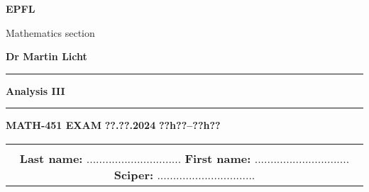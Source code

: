 \documentclass[a4paper]{article}%
\begin{document}

\pagestyle{empty}

\noindent \textbf{EPFL} 

\noindent Mathematics section

\noindent \textbf{Dr Martin Licht} 

\vspace{0.2cm}

\hrule 

\vspace{0.3cm}

\begin{center}
{\LARGE\bf Analysis III}
\end{center}

\vspace{0.3cm}

\hrule

\vspace{0.3cm}

\noindent
\textbf{MATH-451 EXAM}
\hfill
\textbf{??.??.2024}
\hfill 
\textbf{??h??--??h??}


\vspace{1cm} 
\noindent
\begin{tabular}{|c|}
\hline
\\
\textbf{Last name: } ..............................
\hspace{0.6cm}
\textbf{First name: } ..............................
\hspace{0.6cm}
\textbf{Sciper: } ...............................
\\
\hline
\end{tabular}
\end{document}
